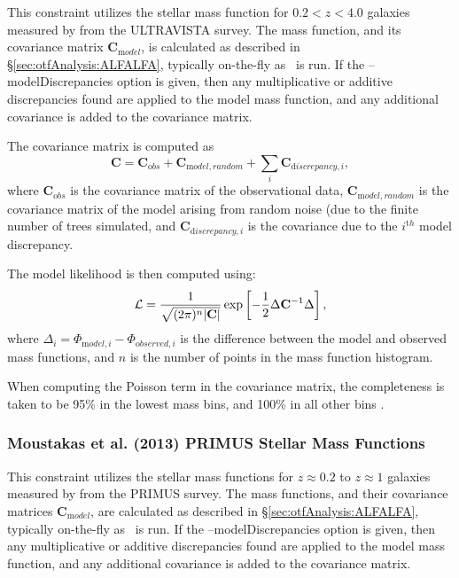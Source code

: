 This constraint utilizes the stellar mass function for $0.2 < z< 4.0$ galaxies measured by \cite{muzzin_evolution_2013} from the ULTRAVISTA survey. The mass function, and its covariance matrix ${\mathbf C}_{\mathrm model}$, is calculated as described in \S\ref{sec:otfAnalysis:ALFALFA}, typically on-the-fly as \glc\ is run. If the {\normalfont \ttfamily --modelDiscrepancies} option is given, then any multiplicative or additive discrepancies found are applied to the model mass function, and any additional covariance is added to the covariance matrix.

The covariance matrix is computed as
\begin{equation}
 {\mathbf C} = {\mathbf C}_{\mathrm obs} + {\mathbf C}_{\mathrm model,random} + \sum_i {\mathbf C}_{{\mathrm discrepancy}, i},
\end{equation}
where ${\mathbf C}_{\mathrm obs}$ is the covariance matrix of the observational data, ${\mathbf C}_{\mathrm model,random}$ is the covariance matrix of the model arising from random noise (due to the finite number of trees simulated, and ${\mathbf C}_{{\mathrm discrepancy}, i}$ is the covariance due to the $i^{\mathrm th}$ model discrepancy.

The model likelihood is then computed using:
\begin{equation}
 \mathcal{L} = {1 \over \sqrt{(2 \pi)^n |{\mathbf C}|}} \exp\left[ -{1\over 2} \Delta {\mathbf C}^{-1} \Delta \right],
\end{equation}
where $\Delta_i = \Phi_{{\mathrm model}, i} - \Phi_{{\mathrm observed}, i}$ is the difference between the model and observed mass functions, and $n$ is the number of points in the mass function histogram.

When computing the Poisson term in the covariance matrix, the completeness is taken to be 95\% in the lowest mass bins, and 100\% in all other bins \citep{muzzin_evolution_2013}.

\subsubsection{Moustakas et al. (2013) PRIMUS Stellar Mass Functions}\label{sec:AnalysisMoustakasPRIMUSSStellarMassFunctions}

This constraint utilizes the stellar mass functions for $z\approx 0.2$ to $z\approx 1$ galaxies measured by \cite{moustakas_primus:_2013} from the PRIMUS survey. The mass functions, and their covariance matrices ${\mathbf C}_{\mathrm model}$, are calculated as described in \S\ref{sec:otfAnalysis:ALFALFA}, typically on-the-fly as \glc\ is run. If the {\normalfont \ttfamily --modelDiscrepancies} option is given, then any multiplicative or additive discrepancies found are applied to the model mass function, and any additional covariance is added to the covariance matrix.

